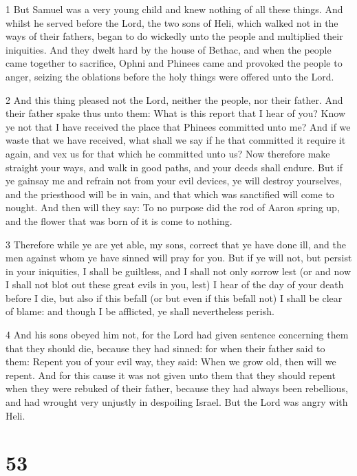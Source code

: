\par 1 But Samuel was a very young child and knew nothing of all these things. And whilst he served before the Lord, the two sons of Heli, which walked not in the ways of their fathers, began to do wickedly unto the people and multiplied their iniquities. And they dwelt hard by the house of Bethac, and when the people came together to sacrifice, Ophni and Phinees came and provoked the people to anger, seizing the oblations before the holy things were offered unto the Lord. 

\par 2 And this thing pleased not the Lord, neither the people, nor their father. And their father spake thus unto them: What is this report that I hear of you? Know ye not that I have received the place that Phinees committed unto me? And if we waste that we have received, what shall we say if he that committed it require it again, and vex us for that which he committed unto us? Now therefore make straight your ways, and walk in good paths, and your deeds shall endure. But if ye gainsay me and refrain not from your evil devices, ye will destroy yourselves, and the priesthood will be in vain, and that which was sanctified will come to nought. And then will they say: To no purpose did the rod of Aaron spring up, and the flower that was born of it is come to nothing. 

\par 3 Therefore while ye are yet able, my sons, correct that ye have done ill, and the men against whom ye have sinned will pray for you. But if ye will not, but persist in your iniquities, I shall be guiltless, and I shall not only sorrow lest (or and now I shall not blot out these great evils in you, lest) I hear of the day of your death before I die, but also if this befall (or but even if this befall not) I shall be clear of blame: and though I be afflicted, ye shall nevertheless perish. 

\par 4 And his sons obeyed him not, for the Lord had given sentence concerning them that they should die, because they had sinned: for when their father said to them: Repent you of your evil way, they said: When we grow old, then will we repent. And for this cause it was not given unto them that they should repent when they were rebuked of their father, because they had always been rebellious, and had wrought very unjustly in despoiling Israel. But the Lord was angry with Heli.

\chapter{53}

